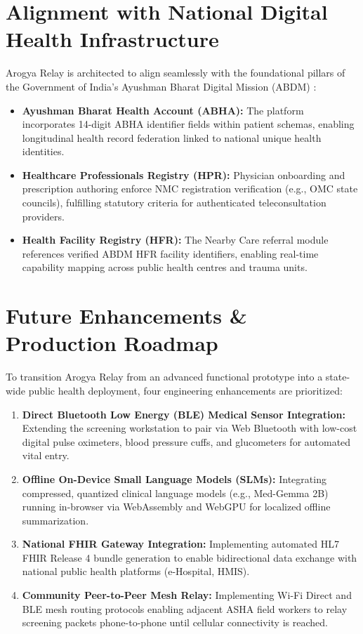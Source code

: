 \documentclass[12pt,a4paper,oneside]{report}
\begin{document}
\section{Alignment with National Digital Health Infrastructure}
Arogya Relay is architected to align seamlessly with the foundational pillars of the Government of India's Ayushman Bharat Digital Mission (ABDM) \cite{abdm2022}:
\begin{itemize}[leftmargin=1.5em,itemsep=3pt,topsep=3pt,parsep=0pt]
    \item \textbf{Ayushman Bharat Health Account (ABHA):} The platform incorporates 14-digit ABHA identifier fields within patient schemas, enabling longitudinal health record federation linked to national unique health identities.
    \item \textbf{Healthcare Professionals Registry (HPR):} Physician onboarding and prescription authoring enforce NMC registration verification (e.g., OMC state councils), fulfilling statutory criteria for authenticated teleconsultation providers.
    \item \textbf{Health Facility Registry (HFR):} The Nearby Care referral module references verified ABDM HFR facility identifiers, enabling real-time capability mapping across public health centres and trauma units.
\end{itemize}

\section{Future Enhancements \& Production Roadmap}
To transition Arogya Relay from an advanced functional prototype into a state-wide public health deployment, four engineering enhancements are prioritized:
\begin{enumerate}[label=\textbf{\arabic*.},itemsep=3pt,topsep=3pt,parsep=0pt]
    \item \textbf{Direct Bluetooth Low Energy (BLE) Medical Sensor Integration:} Extending the screening workstation to pair via Web Bluetooth with low-cost digital pulse oximeters, blood pressure cuffs, and glucometers for automated vital entry.
    \item \textbf{Offline On-Device Small Language Models (SLMs):} Integrating compressed, quantized clinical language models (e.g., Med-Gemma 2B) running in-browser via WebAssembly and WebGPU for localized offline summarization.
    \item \textbf{National FHIR Gateway Integration:} Implementing automated HL7 FHIR Release 4 bundle generation to enable bidirectional data exchange with national public health platforms (e-Hospital, HMIS).
    \item \textbf{Community Peer-to-Peer Mesh Relay:} Implementing Wi-Fi Direct and BLE mesh routing protocols enabling adjacent ASHA field workers to relay screening packets phone-to-phone until cellular connectivity is reached.
\end{enumerate}
\end{document}
